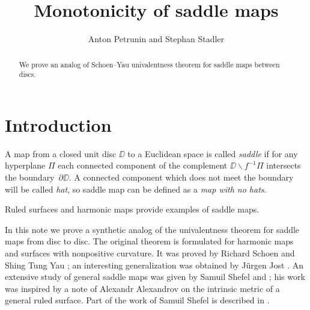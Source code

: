 \documentclass{article}
\begin{document}
\title{Monotonicity of saddle maps}
\author{Anton Petrunin and Stephan Stadler}


\newcommand{\Addresses}{{\bigskip\footnotesize
Anton Petrunin, \par\nopagebreak\textsc{Department of Mathematics, PSU, University Park, PA 16802, USA}
\par\nopagebreak
\textit{Email}: \texttt{petrunin@math.psu.edu}

\medskip

Stephan Stadler,
\par\nopagebreak\textsc{Mathematisches Institut der Universit\"at M\"unchen, Theresienstr. 39, D-80333 M\"unchen, Germany}
\par\nopagebreak
\textit{Email}: \texttt{stadler@math.lmu.de}
}}

\date{}

\maketitle

\begin{abstract}
We prove an analog of Schoen--Yau univalentness theorem for saddle maps between discs.
\end{abstract}

\section{Introduction}

A map from a closed unit disc $\DD$ to a Euclidean space is called \emph{saddle} if for any hyperplane $\Pi$ each connected component of the 
complement $\DD\backslash f^{-1}\Pi$ intersects the boundary~$\partial \DD$.
A connected component which does not meet the boundary will be called \emph{hat},
so saddle map can be defined as a \emph{map with no hats}.

Ruled surfaces and harmonic maps provide examples of saddle maps.

In this note we prove a synthetic analog of the univalentness theorem for saddle maps from disc to disc.
The original theorem is formulated for harmonic maps and surfaces with nonpositive curvature.
It was proved by Richard Schoen and Shing Tung Yau \cite{schoen-yau};
an interesting generalization was obtained by J\"urgen Jost \cite{jost}.
An extensive study of general saddle maps was given by Samuil Shefel \cite{shefel-2D} and \cite{shefel-3D};
his work was inspired by a note of Alexandr Alexandrov \cite{A} on the intrinsic metric of a general ruled surface.
Part of the work of Samuil Shefel is described in \cite{akp}.
\end{document}
